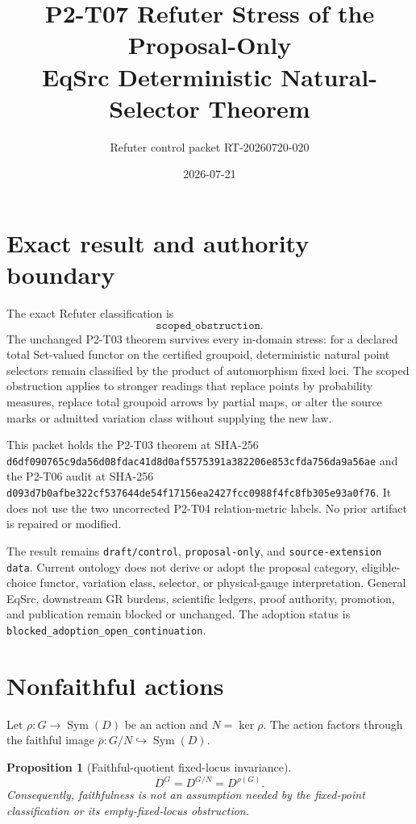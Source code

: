 \documentclass[11pt]{article}
\title{P2-T07 Refuter Stress of the Proposal-Only\\
EqSrc Deterministic Natural-Selector Theorem}
\author{Refuter control packet RT-20260720-020}
\date{2026-07-21}
\newtheorem{proposition}{Proposition}
\begin{document}
\maketitle

\section{Exact result and authority boundary}

The exact Refuter classification is
\[
  \boxed{\texttt{scoped\_obstruction}}.
\]
The unchanged P2-T03 theorem survives every in-domain stress: for a declared
total Set-valued functor on the certified groupoid, deterministic natural
point selectors remain classified by the product of automorphism fixed loci.
The scoped obstruction applies to stronger readings that replace points by
probability measures, replace total groupoid arrows by partial maps, or alter
the source marks or admitted variation class without supplying the new law.

This packet holds the P2-T03 theorem at SHA-256
\texttt{d6df090765c9da56d08fdac41d8d0af5575391a382206e853cfda756da9a56ae}
and the P2-T06 audit at SHA-256
\texttt{d093d7b0afbe322cf537644de54f17156ea2427fcc0988f4fc8fb305e93a0f76}.
It does not use the two uncorrected P2-T04 relation-metric labels. No prior
artifact is repaired or modified.

The result remains \texttt{draft/control}, \texttt{proposal-only}, and
\texttt{source-extension data}. Current ontology does not derive or adopt
the proposal category, eligible-choice functor, variation class, selector,
or physical-gauge interpretation. General EqSrc, downstream GR burdens,
scientific ledgers, proof authority, promotion, and publication remain
blocked or unchanged. The adoption status is
\texttt{blocked\_adoption\_open\_continuation}.

\section{Nonfaithful actions}

Let \(\rho:G\to\operatorname{Sym}(D)\) be an action and
\(N=\ker\rho\). The action factors through the faithful image
\(\bar\rho:G/N\hookrightarrow\operatorname{Sym}(D)\).

\begin{proposition}[Faithful-quotient fixed-locus invariance]
\[
  D^G=D^{G/N}=D^{\rho(G)}.
\]
Consequently, faithfulness is not an assumption needed by the fixed-point
classification or its empty-fixed-locus obstruction.
\end{proposition}
\end{document}
